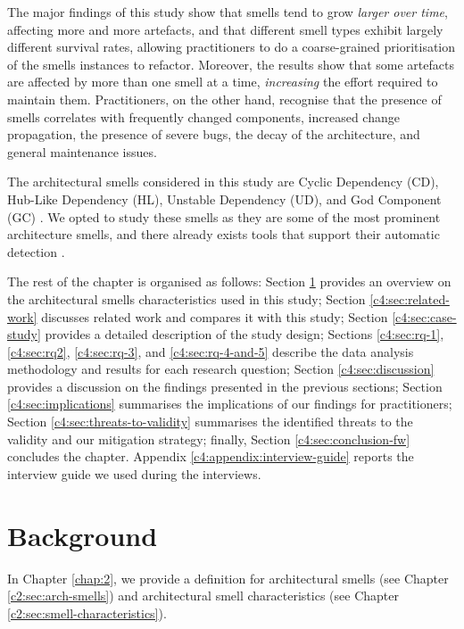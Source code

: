 The major findings of this study show that smells tend to grow \emph{larger over time}, affecting more and more artefacts, and that different smell types exhibit largely different survival rates, allowing practitioners to do a coarse-grained prioritisation of the smells instances to refactor. 
Moreover, the results show that some artefacts are affected by more than one smell at a time, \emph{increasing} the effort required to maintain them.
Practitioners, on the other hand, recognise that the presence of smells correlates with frequently changed components, increased change propagation, the presence of severe bugs, the decay of the architecture, and general maintenance issues.

The architectural smells considered in this study are Cyclic Dependency (CD), Hub-Like Dependency (HL), Unstable Dependency (UD), and God Component (GC) \cite{Arcelli2016,Lippert2006,Sas2019}. We opted to study these smells as they are some of the most prominent architecture smells, and there already exists tools that support their automatic detection \cite{Arcelli2016, Arcelli2017}.

The rest of the chapter is organised as follows: Section \ref{c4:sec:background} provides an overview on the architectural smells  characteristics used in this study; Section \ref{c4:sec:related-work} discusses related work and compares it with this study; Section \ref{c4:sec:case-study} provides a detailed description of the study design; Sections \ref{c4:sec:rq-1}, \ref{c4:sec:rq2}, \ref{c4:sec:rq-3}, and \ref{c4:sec:rq-4-and-5} describe the data analysis methodology and results for each research question; Section \ref{c4:sec:discussion} provides a discussion on the findings presented in the previous sections; Section \ref{c4:sec:implications} summarises the implications of our findings for practitioners; Section \ref{c4:sec:threats-to-validity} summarises the identified threats to the validity and our mitigation strategy; finally, Section \ref{c4:sec:conclusion-fw} concludes the chapter.
Appendix \ref{c4:appendix:interview-guide} reports the interview guide we used during the interviews.

\section{Background}\label{c4:sec:background}
In Chapter \ref{chap:2}, we provide a definition for architectural smells (see Chapter \ref{c2:sec:arch-smells}) and architectural smell characteristics (see Chapter \ref{c2:sec:smell-characteristics}).

